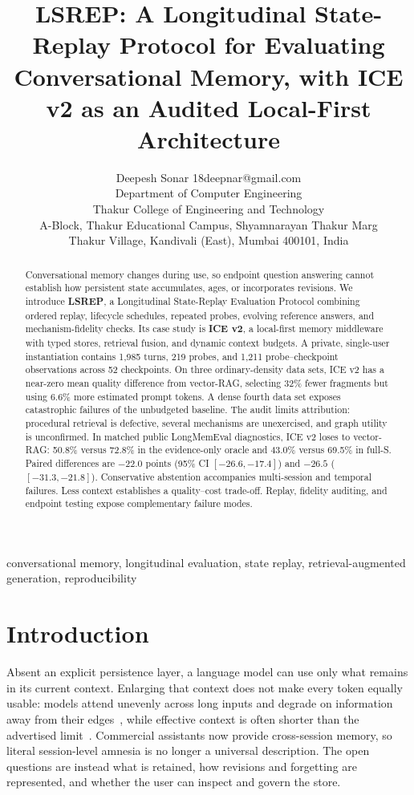 \documentclass[twoside,11pt]{article}
\title{LSREP: A Longitudinal State-Replay Protocol for Evaluating Conversational Memory, with ICE v2 as an Audited Local-First Architecture}
\author{\name Deepesh Sonar \email 18deepnar@gmail.com \\
  \addr Department of Computer Engineering\\
  Thakur College of Engineering and Technology\\
  A-Block, Thakur Educational Campus, Shyamnarayan Thakur Marg\\
  Thakur Village, Kandivali (East), Mumbai 400101, India}
\begin{document}
\maketitle
\thispagestyle{plain}

\begin{abstract}%
Conversational memory changes during use, so endpoint question answering cannot establish how persistent state accumulates, ages, or incorporates revisions. We introduce \textbf{LSREP}, a Longitudinal State-Replay Evaluation Protocol combining ordered replay, lifecycle schedules, repeated probes, evolving reference answers, and mechanism-fidelity checks. Its case study is \textbf{ICE v2}, a local-first memory middleware with typed stores, retrieval fusion, and dynamic context budgets. A private, single-user instantiation contains 1,985 turns, 219 probes, and 1,211 probe--checkpoint observations across 52 checkpoints. On three ordinary-density data sets, ICE v2 has a near-zero mean quality difference from vector-RAG, selecting 32\% fewer fragments but using 6.6\% more estimated prompt tokens. A dense fourth data set exposes catastrophic failures of the unbudgeted baseline. The audit limits attribution: procedural retrieval is defective, several mechanisms are unexercised, and graph utility is unconfirmed. In matched public LongMemEval diagnostics, ICE v2 loses to vector-RAG: 50.8\% versus 72.8\% in the evidence-only oracle and 43.0\% versus 69.5\% in full-S. Paired differences are $-22.0$ points (95\% CI $[-26.6,-17.4]$) and $-26.5$ ($[-31.3,-21.8]$). Conservative abstention accompanies multi-session and temporal failures. Less context establishes a quality--cost trade-off. Replay, fidelity auditing, and endpoint testing expose complementary failure modes.
\end{abstract}
\begin{keywords}
conversational memory, longitudinal evaluation, state replay, retrieval-augmented generation, reproducibility
\end{keywords}

\section{Introduction}
\label{sec:intro}

Absent an explicit persistence layer, a language model can use only what remains in its current context. Enlarging that context does not make every token equally usable: models attend unevenly across long inputs and degrade on information away from their edges~\citep{liu2024lost}, while effective context is often shorter than the advertised limit~\citep{hsieh2024ruler}. Commercial assistants now provide cross-session memory, so literal session-level amnesia is no longer a universal description. The open questions are instead what is retained, how revisions and forgetting are represented, and whether the user can inspect and govern the store.
\end{document}
